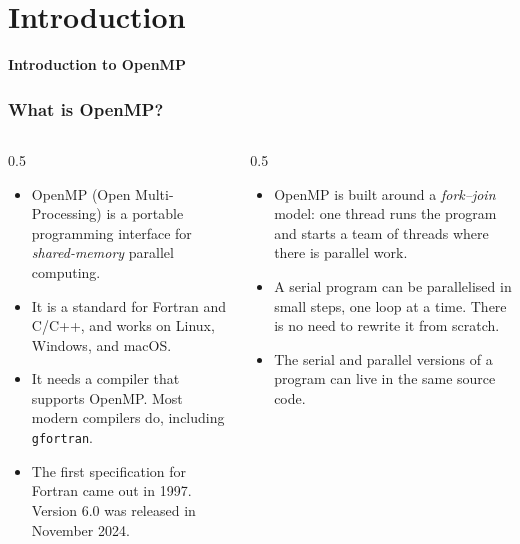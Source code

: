 
\subtitle{Lecture 9: Shared-Memory Parallelisation with OpenMP}



\begin{frame}
  \titlepage
\end{frame}


\section{Introduction}

\begin{frame}
  \centering
  \Huge \textbf{Introduction to OpenMP}
\end{frame}


\begin{frame}
  \frametitle{What is OpenMP?}
  \begin{columns}[T]
    \begin{column}{0.5\textwidth}
      \begin{itemize}
        \item OpenMP (Open Multi-Processing) is a portable programming interface for \emph{shared-memory} parallel computing.
        \item It is a standard for Fortran and C/C++, and works on Linux, Windows, and macOS.
        \item It needs a compiler that supports OpenMP. Most modern compilers do, including \texttt{gfortran}.
        \item The first specification for Fortran came out in 1997. Version 6.0 was released in November 2024.
      \end{itemize}
    \end{column}

    \begin{column}{0.5\textwidth}
      \begin{itemize}
        \item OpenMP is built around a \emph{fork--join} model: one thread runs the program and starts a team of threads where there is parallel work.
        \item A serial program can be parallelised in small steps, one loop at a time. There is no need to rewrite it from scratch.
        \item The serial and parallel versions of a program can live in the same source code.
      \end{itemize}
    \end{column}
  \end{columns}
\end{frame}


